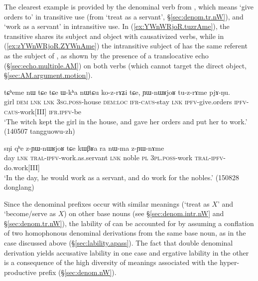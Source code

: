 The clearest example is provided by the denominal verb  from , which  means `give orders to' in transitive use (from `treat as a servant', §\ref{sec:denom.tr.nW}), and `work as a servant' in intransitive use. In (\ref{ex:YWnWRjoR.tuzrAme}), the transitive   shares its subject and object with causativized verbs, while in (\ref{ex:zYWnWRjoR.ZYWnAme}) the intransitive subject of  has the same referent as the subject of , as shown by the presence of a translocative echo (§\ref{sec:echo.multiple.AM}) on both verbs (which cannot target the direct object, §\ref{sec:AM.argument.motion}). 

\begin{exe}
\ex \label{ex:YWnWRjoR.tuzrAme}
\gll tɕʰeme nɯ tɕe tɕe ɯ-kʰa nɯtɕu ko-z-rɤʑi tɕe, ɲɯ-nɯʁjoʁ tu-z-rɤme pjɤ-ŋu. \\
girl \textsc{dem} \textsc{lnk} \textsc{lnk} \textsc{3sg}.\textsc{poss}-house \textsc{dem}:\textsc{loc} \textsc{ifr}-\textsc{caus}-stay \textsc{lnk} \textsc{ipfv}-give.orders \textsc{ipfv}-\textsc{caus}-work[III] \textsc{ifr}.\textsc{ipfv}-be \\
\glt `The witch kept the girl in the house, and gave her orders and put her to work.' (140507 tangguowu-zh) 
\end{exe}


\begin{exe}
\ex \label{ex:zYWnWRjoR.ZYWnAme}
\gll sŋi qʰe z-ɲɯ-nɯʁjoʁ tɕe kɯβʁa ra nɯ-ma z-ɲɯ-nɤme \\
day \textsc{lnk} \textsc{tral}-\textsc{ipfv}-work.as.servant \textsc{lnk} noble \textsc{pl} \textsc{3pl}.\textsc{poss}-work \textsc{tral}-\textsc{ipfv}-do.work[III] \\
\glt `In the day, he would work as a servant, and do work for the nobles.' (150828 donglang)
\end{exe}


Since the  denominal prefixes occur with similar  meanings (`treat as $X$' and `become/serve as $X$) on other base nouns (see §\ref{sec:denom.intr.nW} and §\ref{sec:denom.tr.nW}), the lability of  can be accounted for by assuming a conflation of two homophonous denominal derivations from the same base noun, as in the case   discussed above (§\ref{sec:lability.apass}). The fact that double denominal derivation yields accusative lability in one case and ergative lability in the other is a consequence of the high diversity of meanings associated with the hyper-productive  prefix (§\ref{sec:denom.nW}).

